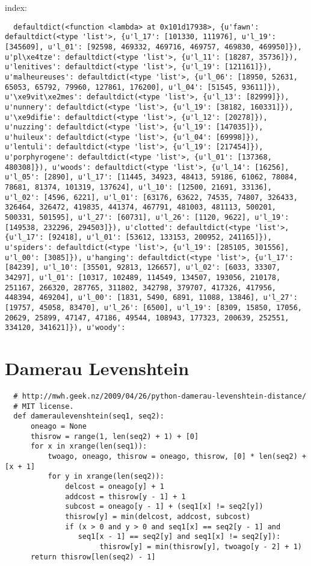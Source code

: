 index:\\
\begin{verbatim}
  defaultdict(<function <lambda> at 0x101d17938>, {u'fawn': defaultdict(<type 'list'>, {u'l_17': [101330, 111976], u'l_19': [345609], u'l_01': [92598, 469332, 469716, 469757, 469830, 469950]}), u'pl\xe4tze': defaultdict(<type 'list'>, {u'l_11': [18287, 35736]}), u'lenitives': defaultdict(<type 'list'>, {u'l_19': [121161]}), u'malheureuses': defaultdict(<type 'list'>, {u'l_06': [18950, 52631, 65053, 65792, 79960, 127861, 176200], u'l_04': [51545, 93611]}), u'\xe9vit\xe2mes': defaultdict(<type 'list'>, {u'l_13': [82999]}), u'nunnery': defaultdict(<type 'list'>, {u'l_19': [38182, 160331]}), u'\xe9difie': defaultdict(<type 'list'>, {u'l_12': [20278]}), u'nuzzing': defaultdict(<type 'list'>, {u'l_19': [147035]}), u'huileux': defaultdict(<type 'list'>, {u'l_04': [69998]}), u'lentuli': defaultdict(<type 'list'>, {u'l_19': [217454]}), u'porphyrogene': defaultdict(<type 'list'>, {u'l_01': [137368, 480308]}), u'woods': defaultdict(<type 'list'>, {u'l_14': [16256], u'l_05': [2890], u'l_17': [11445, 34923, 48413, 59186, 61062, 78084, 78681, 81374, 101319, 137624], u'l_10': [12500, 21691, 33136], u'l_02': [4596, 6221], u'l_01': [63176, 63622, 74535, 74807, 326433, 326464, 326472, 419835, 441374, 467791, 481003, 481113, 500201, 500331, 501595], u'l_27': [60731], u'l_26': [1120, 9622], u'l_19': [149538, 232296, 294503]}), u'clotted': defaultdict(<type 'list'>, {u'l_17': [92418], u'l_01': [53612, 133153, 200952, 241165]}), u'spiders': defaultdict(<type 'list'>, {u'l_19': [285105, 301556], u'l_00': [3085]}), u'hanging': defaultdict(<type 'list'>, {u'l_17': [84239], u'l_10': [35501, 92813, 126657], u'l_02': [6033, 33307, 34297], u'l_01': [10317, 102489, 114549, 134507, 193056, 210178, 251167, 266320, 287765, 311802, 342798, 379707, 417326, 417956, 448394, 469204], u'l_00': [1831, 5490, 6891, 11088, 13846], u'l_27': [19757, 45058, 83470], u'l_26': [6500], u'l_19': [8309, 15850, 17056, 20629, 25899, 47147, 47186, 49544, 108943, 177323, 200639, 252551, 334120, 341621]}), u'woody':
\end{verbatim}


\section{Damerau Levenshtein}

\begin{verbatim}
  # http://mwh.geek.nz/2009/04/26/python-damerau-levenshtein-distance/
  # MIT license.
  def dameraulevenshtein(seq1, seq2):
      oneago = None
      thisrow = range(1, len(seq2) + 1) + [0]
      for x in xrange(len(seq1)):
          twoago, oneago, thisrow = oneago, thisrow, [0] * len(seq2) + [x + 1]
          for y in xrange(len(seq2)):
              delcost = oneago[y] + 1
              addcost = thisrow[y - 1] + 1
              subcost = oneago[y - 1] + (seq1[x] != seq2[y])
              thisrow[y] = min(delcost, addcost, subcost)
              if (x > 0 and y > 0 and seq1[x] == seq2[y - 1] and
                 seq1[x - 1] == seq2[y] and seq1[x] != seq2[y]):
                      thisrow[y] = min(thisrow[y], twoago[y - 2] + 1)
      return thisrow[len(seq2) - 1]
\end{verbatim}


